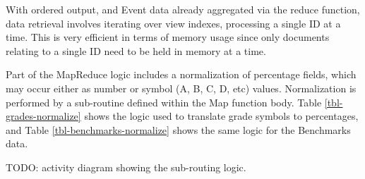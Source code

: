 With ordered output, and Event data already aggregated via the reduce function, data retrieval involves iterating over view indexes, processing a single ID at a time. This is very efficient in terms of memory usage since only documents relating to a single ID need to be held in memory at a time.

Part of the MapReduce logic includes a normalization of percentage fields, which may occur either as number or symbol (A, B, C, D, etc) values. Normalization is performed by a sub-routine defined within the Map function body. Table \ref{tbl-grades-normalize} shows the logic used to translate grade symbols to percentages, and Table \ref{tbl-benchmarks-normalize} shows the same logic for the Benchmarks data.

TODO: activity diagram showing the sub-routing logic.